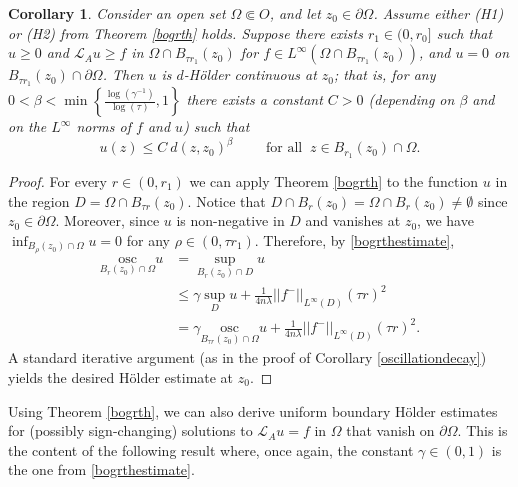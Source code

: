 \documentclass[12pt]{amsart}
\newtheorem{Corollary}[Theorem]{Corollary}
\newcommand{\osc}{\mathrm{osc}}
\def \L {\mathcal{L}}
\def \O {\Omega}
\def \t {\tau}
\begin{document}
\begin{Corollary}
Consider an open set $\O \Subset O$, and let $z_0\in\partial\O$. Assume either {\rm{(H1)}} or {\rm{(H2)}} from Theorem \ref{bogrth} holds. Suppose there exists $r_1\in (0,r_0]$ such that $u \geq 0$ and $\L_A u \geq f$ in $\O\cap B_{\t r_1}(z_0)$ for $f \in L^{\infty}(\O\cap B_{\t r_1}(z_0))$, and $u = 0$ on $B_{\t r_1}(z_0) \cap \partial \O$. Then $u$ is $d$-H\"older continuous at $z_0$; that is, for any $0<\beta<\min\left\{\frac{\log(\gamma^{-1})}{\log(\tau)},1\right\}$ there exists a constant $C > 0$ (depending on $\beta$ and on the $L^\infty$ norms of $f$ and $u$) such that
$$u(z) \leq C \ d(z, z_0)^{\beta} \qquad \text{ for all } \ z \in B_{r_1}(z_0) \cap \O.$$
\end{Corollary}
\begin{proof}
For every $r \in (0,r_1)$ we can apply Theorem \ref{bogrth} to the function $u$ in the region $D = \O\cap B_{\tau r}(z_0)$. Notice that $D\cap B_r(z_0)=\O\cap B_{ r}(z_0)\neq\emptyset$ since $z_0\in\partial\O$. Moreover, since $u$ is non-negative in $D$ and vanishes at $z_0$, we have $\inf_{B_{\rho}(z_0) \cap \O} u = 0$ for any $\rho \in (0,\tau r_1)$. Therefore, by \eqref{bogrthestimate},
\begin{align*}
\underset{B_{r}(z_0) \cap \O}{\osc}  u & =\sup_{B_r(z_0) \cap D} u \\
& \leq \gamma \sup_{D} u + \frac{1}{4n\lambda} ||f^-||_{L^{\infty}(D)} (\tau r)^2 \\
& =  \gamma \underset{B_{\t r}(z_0) \cap \O}{\osc}  u + \frac{1}{4n\lambda} ||f^-||_{L^{\infty}(D)} (\tau r)^2.
\end{align*}
A standard iterative argument (as in the proof of Corollary \ref{oscillationdecay}) yields the desired H\"older estimate at $z_0$.
\end{proof}

Using Theorem \ref{bogrth}, we can also derive uniform boundary H\"older estimates for (possibly sign-changing) solutions to $\L_A u =f$ in $\Omega$ that vanish on $\partial\O$. This is the content of the following result where, once again, the constant $\gamma\in(0,1)$ is the one from \eqref{bogrthestimate}. 
\end{document}
